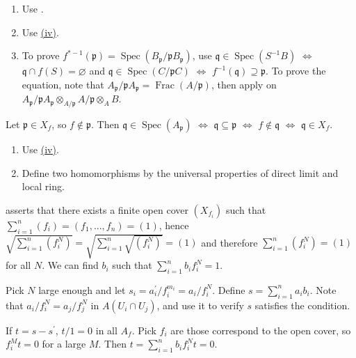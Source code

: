 \begin{exercise}\label{ex3.21}
	\begin{enumerate}[label=\textup{(\roman*)},ref=\theexercise(\roman*)]
		\item[(i),(ii)] Use .
		\item[(iii)] Use \hyperref[ex1.21]{(iv)}.
		\item[(iv)] To prove $f^{*-1}(\mathfrak{p})=\operatorname{Spec}\left(B_\mathfrak{p}/\mathfrak{p}B_\mathfrak{p}\right)$, use $\mathfrak{q}\in\operatorname{Spec}\left(S^{-1}B\right)$ $\Leftrightarrow$ $\mathfrak{q}\cap f(S)=\varnothing$ and $\mathfrak{q}\in\operatorname{Spec}\left(C/\mathfrak{p}C\right)$ $\Leftrightarrow$ $f^{-1}(\mathfrak{q})\supseteq\mathfrak{p}$. To prove the equation, note that $A_\mathfrak{p}/\mathfrak{p}A_\mathfrak{p}=\operatorname{Frac}(A/\mathfrak{p})$, then apply  on $A_\mathfrak{p}/\mathfrak{p}A_\mathfrak{p}\otimes_{A/\mathfrak{p}}A/\mathfrak{p}\otimes_AB$.
	\end{enumerate}
\end{exercise}

\begin{exercise}\label{ex3.22}
	Let $\mathfrak{p}\in X_f$, so $f\notin\mathfrak{p}$. Then $\mathfrak{q}\in\operatorname{Spec}\left(A_\mathfrak{p}\right)$ $\Leftrightarrow$ $\mathfrak{q}\subseteq\mathfrak{p}$ $\Leftrightarrow$ $f\notin\mathfrak{q}$ $\Leftrightarrow$ $\mathfrak{q}\in X_f$.
\end{exercise}

\begin{exercise}\label{ex3.23}
	\begin{enumerate}[label=\textup{(\roman*)},ref=\theexercise(\roman*)]
		\item Use \hyperref[ex1.17]{(iv)}.
		\addtocounter{enumi}{4}
		\item[(v)] Define two homomorphisms by the universal properties of direct limit and local ring.
	\end{enumerate}
\end{exercise}

\begin{exercise}\label{ex3.24}
	 asserts that there exists a finite open cover $\left(X_{f_i}\right)$ such that $\sum_{i=1}^n\left(f_i\right)=\left(f_1,...,f_n\right)=(1)$, hence $\sqrt{\sum_{i=1}^n\left(f_i^N\right)}=\sqrt{\sum_{i=1}^n\sqrt{\left(f_i^N\right)}}=(1)$ and therefore $\sum_{i=1}^n\left(f_i^N\right)=(1)$ for all $N$. We can find $b_i$ such that $\sum_{i=1}^nb_if_i^N=1$.
	
	Pick $N$ large enough and let $s_i=a_i^\prime/f_i^{m_i}=a_i/f_i^N$. Define $s=\sum_{i=1}^na_ib_i$. Note that $a_i/f_i^N=a_j/f_j^N$ in $A\left(U_i\cap U_j\right)$, and use it to verify $s$ satisfies the condition.
	
	If $t=s-s^\prime$, $t/1=0$ in all $A_f$. Pick $f_i$ are those correspond to the open cover, so $f_i^Mt=0$ for a large $M$. Then $t=\sum_{i=1}^nb_if_i^Nt=0$.
\end{exercise}


